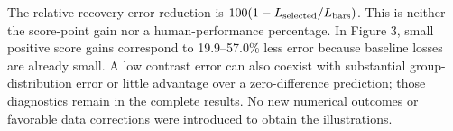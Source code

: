 \documentclass[10pt]{article}
\begin{document}
The relative recovery-error reduction is $100(1-L_{\rm selected}/L_{\rm bars})$. This is neither the score-point gain nor a human-performance percentage. In Figure 3, small positive score gains correspond to 19.9--57.0\% less error because baseline losses are already small. A low contrast error can also coexist with substantial group-distribution error or little advantage over a zero-difference prediction; those diagnostics remain in the complete results. No new numerical outcomes or favorable data corrections were introduced to obtain the illustrations.

\begingroup\footnotesize\endgroup
\end{document}
